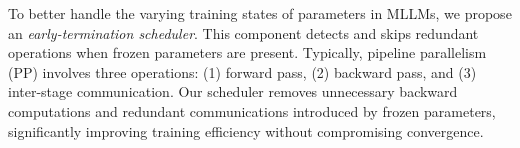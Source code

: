 \documentclass[conference]{IEEEtran}
\begin{document}
To better handle the varying training states of parameters in MLLMs, we propose an \textit{early-termination scheduler}.
This component detects and skips redundant operations when frozen parameters are present.
Typically, pipeline parallelism (PP) involves three operations: (1) forward pass, (2) backward pass, and (3) inter-stage communication.
Our scheduler removes unnecessary backward computations and redundant communications introduced by frozen parameters, significantly improving training efficiency without compromising convergence.

\end{document}
